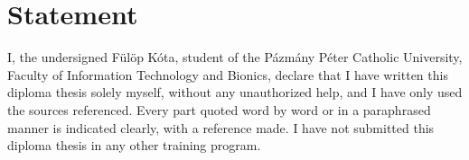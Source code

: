 
\chapter*{Statement}
I, the undersigned Fülöp Kóta, student of the Pázmány Péter Catholic University, Faculty of Information Technology and Bionics, declare that I have written this diploma thesis solely myself, without any unauthorized help, and I have only used the sources referenced. Every part quoted word by word or in a paraphrased manner is indicated clearly, with a reference made. I have not submitted this diploma thesis in any other training program.

\begin{flushright}
	\vspace*{.5cm}\par\noindent\makebox[2.5in]{\hrulefill}
	\par\noindent\makebox[2.5in][c]{\nev}
\end{flushright}

\clearpage